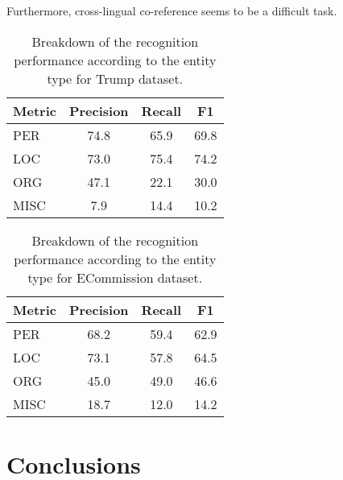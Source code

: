 \documentclass[11pt]{article}
\begin{document}
Furthermore, cross-lingual co-reference seems to be a difficult task.


\begin{table}
  \begin{center}
    \begin{footnotesize}
      \begin{tabular}{lccc}
        \toprule 
        Metric & \textbf{Precision} & \textbf{Recall} & \textbf{F1} \\
        \midrule
        PER & 74.8 & 65.9 & 69.8 \\
        LOC & 73.0 & 75.4 & 74.2 \\
        ORG & 47.1 & 22.1 & 30.0 \\
        MISC & 7.9 & 14.4 & 10.2 \\
        \bottomrule
      \end{tabular}
    \end{footnotesize}
  \end{center}
  \caption{Breakdown of the recognition performance according to the entity type for {\sc Trump} dataset.}
  \label{tab:recognition-breakdown-trump}
\end{table}

\begin{table}
  \begin{center}
    \begin{footnotesize}
      \begin{tabular}{lccc}
        \toprule 
        Metric & \textbf{Precision} & \textbf{Recall} & \textbf{F1} \\
        \midrule
        PER & 68.2 & 59.4 & 62.9 \\
        LOC & 73.1 & 57.8 & 64.5 \\
        ORG & 45.0 & 49.0 & 46.6 \\
        MISC & 18.7 & 12.0 & 14.2 \\
        \bottomrule
      \end{tabular}
    \end{footnotesize}
  \end{center}
  \caption{Breakdown of the recognition performance according to the entity type for {\sc ECommission} dataset.}
  \label{tab:recognition-breakdown-ec}
\end{table}

\section{Conclusions}
\label{sec:conclusions}
\end{document}

